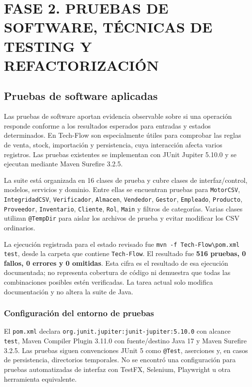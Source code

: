 \section{FASE 2. PRUEBAS DE SOFTWARE, TÉCNICAS DE TESTING Y REFACTORIZACIÓN}

\subsection{Pruebas de software aplicadas}
\label{subsec:testing}

Las pruebas de software aportan evidencia observable sobre si una operación responde conforme a los resultados esperados para entradas y estados determinados. En Tech-Flow son especialmente útiles para comprobar las reglas de venta, stock, importación y persistencia, cuya interacción afecta varios registros. Las pruebas existentes se implementan con JUnit Jupiter 5.10.0 y se ejecutan mediante Maven Surefire 3.2.5.

La suite está organizada en 16 clases de prueba y cubre clases de interfaz/control, modelos, servicios y dominio. Entre ellas se encuentran pruebas para \texttt{MotorCSV}, \texttt{IntegridadCSV}, \texttt{Verificador}, \texttt{Almacen}, \texttt{Vendedor}, \texttt{Gestor}, \texttt{Empleado}, \texttt{Producto}, \texttt{Proveedor}, \texttt{Inventario}, \texttt{Cliente}, \texttt{Rol}, \texttt{Main} y filtros de categorías. Varias clases utilizan \texttt{@TempDir} para aislar los archivos de prueba y evitar modificar los CSV ordinarios.

La ejecución registrada para el estado revisado fue \texttt{mvn -f Tech-Flow\textbackslash pom.xml test}, desde la carpeta que contiene \texttt{Tech-Flow}. El resultado fue \textbf{516 pruebas, 0 fallos, 0 errores y 0 omitidas}. Esta cifra es el resultado de esa ejecución documentada; no representa cobertura de código ni demuestra que todas las combinaciones posibles estén verificadas. La tarea actual solo modifica documentación y no altera la suite de Java.

\subsubsection{Configuración del entorno de pruebas}

El \texttt{pom.xml} declara \texttt{org.junit.jupiter:junit-jupiter:5.10.0} con alcance \texttt{test}, Maven Compiler Plugin 3.11.0 con fuente/destino Java 17 y Maven Surefire 3.2.5. Las pruebas siguen convenciones JUnit 5 como \texttt{@Test}, aserciones y, en casos de persistencia, directorios temporales. No se encontró una configuración para pruebas automatizadas de interfaz con TestFX, Selenium, Playwright u otra herramienta equivalente.

